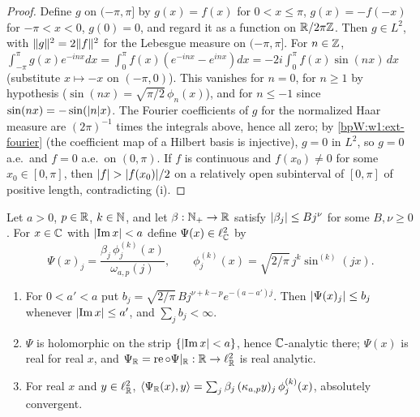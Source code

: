 \begin{proof}
\label{stepW:w1:odd}
Define $g$ on $(-\pi,\pi]$ by $g(x)=f(x)$ for $0<x\le\pi$, $g(x)=-f(-x)$ for $-\pi<x<0$, $g(0)=0$, and regard it as a
function on $\mathbb{R}/2\pi\mathbb{Z}$. Then $g\in L^2$, with $\lVert g\rVert^2=2\lVert f\rVert^2$ for the Lebesgue measure on $(-\pi,\pi]$.
\label{stepW:w1:coeffs}
For $n\in\mathbb{Z}$, $\int_{-\pi}^\pi g(x)e^{-inx}dx=\int_0^\pi f(x)(e^{-inx}-e^{inx})dx=-2i\int_0^\pi f(x)\sin(nx)\,dx$
(substitute $x\mapsto-x$ on $(-\pi,0)$). This vanishes for $n=0$, for $n\ge1$ by hypothesis
($\sin(nx)=\sqrt{\pi/2}\,\phi_n(x)$), and for $n\le-1$ since $\sin(nx)=-\sin(\lvert n\rvert x)$.
\label{stepW:w1:basis}
The Fourier coefficients of $g$ for the normalized Haar measure are $(2\pi)^{-1}$ times the integrals above, hence
all zero; by \ref{bpW:w1:ext-fourier} (the coefficient map of a Hilbert basis is injective), $g=0$ in $L^2$, so $g=0$
a.e.\ and $f=0$ a.e.\ on $(0,\pi)$.
\label{stepW:w1:cont}
If $f$ is continuous and $f(x_0)\ne0$ for some $x_0\in[0,\pi]$, then $\lvert f\rvert>\lvert f(x_0)\rvert/2$ on a relatively open
subinterval of $[0,\pi]$ of positive length, contradicting (i).
\end{proof}

\begin{lemma}\label{bpW:w1:sine-feature}
Let $a>0$, $p\in\mathbb{R}$, $k\in\mathbb{N}$, and let $\beta:\mathbb{N}_+\to\mathbb{R}$ satisfy $\lvert \beta_j\rvert\le Bj^\nu$ for some $B,\nu\ge0$. For
$x\in\mathbb{C}$ with $\lvert \operatorname{Im}x\rvert<a$ define $\Psi(x)\in\ell^2_{\mathbb{C}}$ by
\[\Psi(x)_j=\frac{\beta_j\,\phi_j^{(k)}(x)}{\omega_{a,p}(j)},\qquad\phi_j^{(k)}(x)=\sqrt{2/\pi}\,j^k\sin^{(k)}(jx).\]
\begin{enumerate}[label=(\roman*)]
\item For $0<a'<a$ put $b_j=\sqrt{2/\pi}\,Bj^{\nu+k-p}e^{-(a-a')j}$. Then $\lvert \Psi(x)_j\rvert\le b_j$ whenever
  $\lvert \operatorname{Im}x\rvert\le a'$, and $\sum_jb_j<\infty$.
\item $\Psi$ is holomorphic on the strip $\{\lvert \operatorname{Im}x\rvert<a\}$, hence $\mathbb{C}$-analytic there; $\Psi(x)$ is real
  for real $x$, and $\Psi_{\mathbb{R}}=\operatorname{re}\circ\Psi|_{\mathbb{R}}:\mathbb{R}\to\ell^2_{\mathbb{R}}$ is real analytic.
\item For real $x$ and $y\in\ell^2_{\mathbb{R}}$, $\langle\Psi_{\mathbb{R}}(x),y\rangle=\sum_j\beta_j\,(\kappa_{a,p}y)_j\,\phi_j^{(k)}(x)$,
  absolutely convergent.
\end{enumerate}
\end{lemma}

